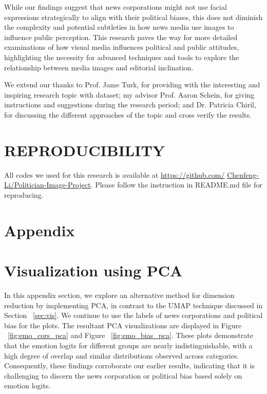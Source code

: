 \documentclass[sigconf]{acmart}
\begin{document}
While our findings suggest that news corporations might not use facial expressions strategically to align with their political biases, this does not diminish the complexity and potential subtleties in how news media use images to influence public perception. This research paves the way for more detailed examinations of how visual media influences political and public attitudes, highlighting the necessity for advanced techniques and tools to explore the relationship between media images and editorial inclination.



\begin{acks}
We extend our thanks to Prof. Jame Turk, for providing with the interesting and inspiring research topic with dataset; my advisor Prof. Aaron Schein, for giving instructions and suggestions during the research period; and Dr. Patricia Chiril, for discussing the different approaches of the topic and cross verify the results.
\end{acks}


\section*{REPRODUCIBILITY}
All codes we used for this research is available at \href{https://github.com/Chenfeng-Li/Politician-Image-Project}{\underline{https://github.com/}} \href{https://github.com/Chenfeng-Li/Politician-Image-Project}{\underline{Chenfeng-Li/Politician-Image-Project}}. Please follow the instruction in README.md file for reproducing.






\section*{Appendix}
\appendix

\section{Visualization using PCA}\label{sec:vis_pca}
In this appendix section, we explore an alternative method for dimension reduction by implementing PCA, in contrast to the UMAP technique discussed in Section ~\ref{sec:vis}. We continue to use the labels of news corporations and political bias for the plots. The resultant PCA visualizations are displayed in Figure ~\ref{fig:emo_cors_pca} and Figure ~\ref{fig:emo_bias_pca}. These plots demonstrate that the emotion logits for different groups are nearly indistinguishable, with a high degree of overlap and similar distributions observed across categories. Consequently, these findings corroborate our earlier results, indicating that it is challenging to discern the news corporation or political bias based solely on emotion logits.
\end{document}
